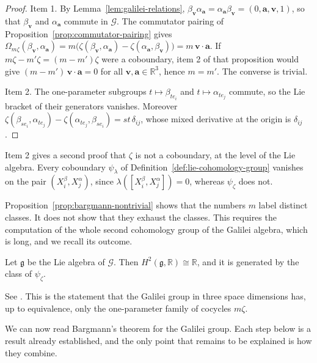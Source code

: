 \begin{proof}
	Item 1. By Lemma~\ref{lem:galilei-relations}, $\beta_{\mathbf{v}}\alpha_{\mathbf{a}}=\alpha_{\mathbf{a}}\beta_{\mathbf{v}}=(0,\mathbf{a},\mathbf{v},1)$, so that $\beta_{\mathbf{v}}$ and $\alpha_{\mathbf{a}}$ commute in $\mathcal{G}$. The commutator pairing of Proposition~\ref{prop:commutator-pairing} gives $\Omega_{m\zeta}(\beta_{\mathbf{v}},\alpha_{\mathbf{a}})=m\big(\zeta(\beta_{\mathbf{v}},\alpha_{\mathbf{a}})-\zeta(\alpha_{\mathbf{a}},\beta_{\mathbf{v}})\big)=m\,\mathbf{v}\cdot\mathbf{a}$. If $m\zeta-m'\zeta=(m-m')\zeta$ were a coboundary, item 2 of that proposition would give $(m-m')\,\mathbf{v}\cdot\mathbf{a}=0$ for all $\mathbf{v},\mathbf{a}\in\mathbb{R}^3$, hence $m=m'$. The converse is trivial.
	
	Item 2. The one-parameter subgroups $t\mapsto\beta_{te_i}$ and $t\mapsto\alpha_{te_j}$ commute, so the Lie bracket of their generators vanishes. Moreover $\zeta(\beta_{se_i},\alpha_{te_j})-\zeta(\alpha_{te_j},\beta_{se_i})=st\,\delta_{ij}$, whose mixed derivative at the origin is $\delta_{ij}$.
\end{proof}

\noindent Item 2 gives a second proof that $\zeta$ is not a coboundary, at the level of the Lie algebra. Every coboundary $\psi_\lambda$ of Definition~\ref{def:lie-cohomology-group} vanishes on the pair $(X^\beta_i,X^\alpha_j)$, since $\lambda([X^\beta_i,X^\alpha_j])=0$, whereas $\psi_\zeta$ does not.

Proposition~\ref{prop:bargmann-nontrivial} shows that the numbers $m$ label distinct classes. It does not show that they exhaust the classes. This requires the computation of the whole second cohomology group of the Galilei algebra, which is long, and we recall its outcome.

\begin{proposition}\label{prop:galilei-cohomology}
	Let $\mathfrak{g}$ be the Lie algebra of $\mathcal{G}$. Then $H^2(\mathfrak{g},\mathbb{R})\cong\mathbb{R}$, and it is generated by the class of $\psi_\zeta$.
\end{proposition}

\noindent See \cite[TODO-location]{TODO-Bargmann1954}. This is the statement that the Galilei group in three space dimensions has, up to equivalence, only the one-parameter family of cocycles $m\zeta$.

We can now read Bargmann's theorem for the Galilei group. Each step below is a result already established, and the only point that remains to be explained is how they combine.

